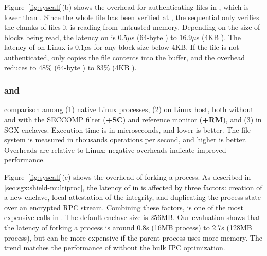 Figure~\ref{fig:syscall}(b)
shows the overhead for authenticating files in , which 
is lower than .
Since the whole file has been verified at , the sequential  only verifies the chunks of files it is reading from untrusted memory.
Depending on the size of blocks being read, the latency on \graphenesgx{} is 0.5$\mu$s (64-byte ) to 16.9$\mu$s (4KB ). The latency of  on Linux is \roughly{}0.1$\mu$s for any block size below 4KB.
If the file is not authenticated,
\graphenesgx{} only copies the file contents into the buffer, and the overhead reduces to 48\% (64-byte ) to 83\% (4KB ).



\subsubsection{ and }


\begin{table}[t!b!]

\caption{\lmbench{} comparison among (1) native Linux processes, (2) \graphene{} \picoprocs{} on Linux host, both without and with the SECCOMP filter ({\bf +SC}) and reference monitor ({\bf +RM}), and (3) \graphene{} in SGX enclaves.
Execution time is in microseconds, and lower is better. 
The file system is measured in thousands operations per second, and higher is better.
Overheads are relative to Linux; negative overheads indicate improved performance.} 
\label{tab:graphene:lmbench}
\end{table}


Figure~\ref{fig:syscall}(c) shows the overhead of forking a process.
As described in \ref{sec:sgx:shield-multiproc}, the latency of  in \graphenesgx{} is affected by three factors:
creation of a new enclave, local attestation of the integrity, and duplicating the process state over an encrypted RPC stream.
Combining these factors,  is one of the most expensive calls in \graphenesgx{}.
The default enclave size is 256MB.
Our evaluation shows that the latency of forking a process is around 0.8s (16MB process) to 2.7s (128MB process), but can be more expensive if the parent process uses more memory.
The trend matches the performance of \graphene{} without the bulk IPC optimization.

